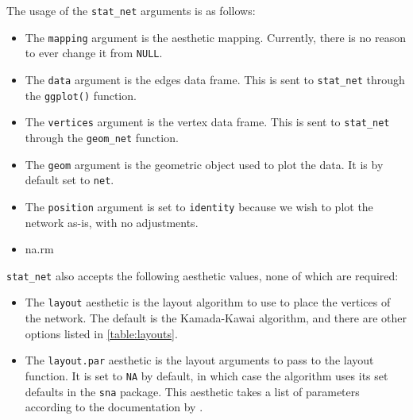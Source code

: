 \documentclass[11pt]{article}\usepackage[]{graphicx}\usepackage[]{color}
\begin{document}
  The usage of the \texttt{stat\_net} arguments is as follows:
  \begin{itemize}
  \item The \texttt{mapping} argument is the aesthetic mapping. Currently, there is no reason to ever change it from \texttt{NULL}.
  \item The \texttt{data} argument is the edges data frame.  This is sent to \texttt{stat\_net} through the \texttt{ggplot()} function.
  \item The \texttt{vertices} argument is the vertex data frame. This is sent to \texttt{stat\_net} through the \texttt{geom\_net} function.
  \item The \texttt{geom} argument is the geometric object used to plot the data. It is by default set to \texttt{net}.
  \item The \texttt{position} argument is set to \texttt{identity} because we wish to plot the network as-is, with no adjustments.
  \item na.rm
  \end{itemize}
  \texttt{stat\_net} also accepts the following aesthetic values, none of which are required:
  \begin{itemize}
  \item The \texttt{layout} aesthetic is the layout algorithm to use to place the vertices of the network.  The default is the Kamada-Kawai algorithm, and there are other options listed in \ref{table:layouts}.
  \item The \texttt{layout.par} aesthetic is the layout arguments to pass to the layout function.  It is set to \texttt{NA} by default, in which case the algorithm uses its set defaults in the \texttt{sna} package. This aesthetic takes a list of parameters according to the documentation by \citet{sna}.
  \end{itemize}
\end{document}
